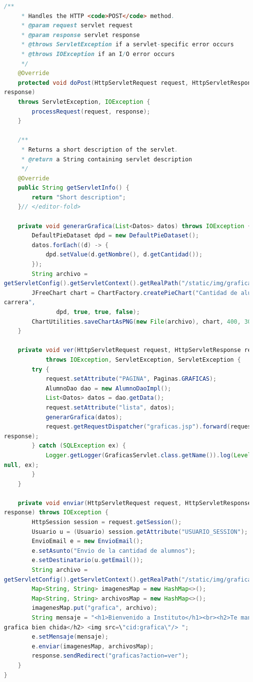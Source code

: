 \documentclass[a4paper,12pt]{article}
\begin{document}
\begin{lstlisting}[language=Java, style=customJava, 
caption={GraficasServlet.java}, captionpos=b,basicstyle=\fontfamily{cmss}\small]
    /** 
     * Handles the HTTP <code>POST</code> method.
     * @param request servlet request
     * @param response servlet response
     * @throws ServletException if a servlet-specific error occurs
     * @throws IOException if an I/O error occurs
     */
    @Override
    protected void doPost(HttpServletRequest request, HttpServletResponse 
response)
    throws ServletException, IOException {
        processRequest(request, response);
    }

    /** 
     * Returns a short description of the servlet.
     * @return a String containing servlet description
     */
    @Override
    public String getServletInfo() {
        return "Short description";
    }// </editor-fold>

    private void generarGrafica(List<Datos> datos) throws IOException {
        DefaultPieDataset dpd = new DefaultPieDataset();
        datos.forEach((d) -> {
            dpd.setValue(d.getNombre(), d.getCantidad());
        });
        String archivo = 
getServletConfig().getServletContext().getRealPath("/static/img/grafica.png");
        JFreeChart chart = ChartFactory.createPieChart("Cantidad de alumnos por 
carrera", 
               dpd, true, true, false);
        ChartUtilities.saveChartAsPNG(new File(archivo), chart, 400, 300);
    }

    private void ver(HttpServletRequest request, HttpServletResponse response) 
            throws IOException, ServletException, ServletException {
        try {
            request.setAttribute("PAGINA", Paginas.GRAFICAS);
            AlumnoDao dao = new AlumnoDaoImpl();
            List<Datos> datos = dao.getData();
            request.setAttribute("lista", datos);
            generarGrafica(datos);
            request.getRequestDispatcher("graficas.jsp").forward(request, 
response);
        } catch (SQLException ex) {
            Logger.getLogger(GraficasServlet.class.getName()).log(Level.SEVERE, 
null, ex);
        }
    }

    private void enviar(HttpServletRequest request, HttpServletResponse 
response) throws IOException {
        HttpSession session = request.getSession();
        Usuario u = (Usuario) session.getAttribute("USUARIO_SESSION");
        EnvioEmail e = new EnvioEmail();
        e.setAsunto("Envio de la cantidad de alumnos");
        e.setDestinatario(u.getEmail());
        String archivo = 
getServletConfig().getServletContext().getRealPath("/static/img/grafica.png");
        Map<String, String> imagenesMap = new HashMap<>();
        Map<String, String> archivosMap = new HashMap<>();
        imagenesMap.put("grafica", archivo);
        String mensaje = "<h1>Bienvenido a Instituto</h1><br><h2>Te mandamos una 
grafica bien chida</h2> <img src=\"cid:grafica\"/> ";
        e.setMensaje(mensaje);
        e.enviar(imagenesMap, archivosMap);
        response.sendRedirect("graficas?action=ver");
    }
}

\end{lstlisting}
\end{document}

